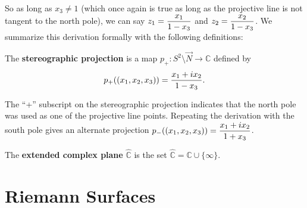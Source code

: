 So as long as $x_3\neq 1$ (which once again is true as long as the projective line is not tangent to the north pole), we can say $z_1=\dfrac{{x_1}}{{1-x_3}}$ and $z_2=\dfrac{{x_2}}{{1-x_3}}$. We summarize this derivation formally with the following definitions:

\begin{definition}[]
    The \textbf{\textcolor{myblue}{stereographic projection}} is a map $p_+:S^2\setminus\vec{N}\to \mathbb{C}$ defined by \begin{equation}p_+((x_1,x_2,x_3))=\dfrac{{x_1+ix_2}}{{1-x_3}}.\end{equation}
\end{definition}
The ``+'' subscript on the stereographic projection indicates that the north pole was used as one of the projective line points. Repeating the derivation with the south pole gives an alternate projection $p_-((x_1,x_2,x_3))=\dfrac{{x_1+ix_2}}{{1+x_3}}$. 

\begin{definition}The \textbf{\textcolor{myblue}{extended complex plane}} $\widehat{\mathbb{C}}$ is the set $\widehat{\mathbb{C}}=\mathbb{C}\cup\{\infty\}$.
\end{definition}


\section{Riemann Surfaces}